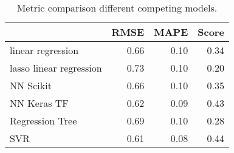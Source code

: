 \begin{table}[h!]
\centering
\caption{Metric comparison different competing models.}
\label{tab:model_results}
\begin{tabular}{lrrr}
\toprule
{} &  RMSE &  MAPE &  Score \\
\midrule
linear regression       &  0.66 &  0.10 &   0.34 \\
lasso linear regression &  0.73 &  0.10 &   0.20 \\
NN Scikit               &  0.66 &  0.10 &   0.35 \\
NN Keras TF             &  0.62 &  0.09 &   0.43 \\
Regression Tree         &  0.69 &  0.10 &   0.28 \\
SVR                     &  0.61 &  0.08 &   0.44 \\
\bottomrule
\end{tabular}
\end{table}

